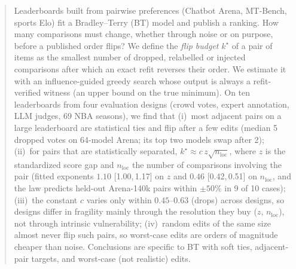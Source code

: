 \documentclass{article}
\theoremstyle{plain}
\theoremstyle{remark}
\newcommand{\nloc}{n_{\mathrm{loc}}}
\newcommand{\kstar}{k^\star}
\begin{document}
\printAffiliationsAndNotice{}

\begin{abstract}
Leaderboards built from pairwise preferences (Chatbot Arena, MT-Bench, sports Elo) fit a Bradley--Terry (BT) model and publish a ranking. How many comparisons must change, whether through noise or on purpose, before a published order flips? We define the \emph{flip budget} $\kstar$ of a pair of items as the smallest number of dropped, relabelled or injected comparisons after which an exact refit reverses their order. We estimate it with an influence-guided greedy search whose output is always a refit-verified witness (an upper bound on the true minimum). On ten leaderboards from four evaluation designs (crowd votes, expert annotation, LLM judges, 69 NBA seasons), we find that (i)~most adjacent pairs on a large leaderboard are statistical ties and flip after a few edits (median 5 dropped votes on 64-model Arena; its top two models swap after 2); (ii)~for pairs that are statistically separated, $\kstar \approx c\,z\sqrt{\nloc}$, where $z$ is the standardized score gap and $\nloc$ the number of comparisons involving the pair (fitted exponents $1.10$ [1.00,\,1.17] on $z$ and $0.46$ [0.42,\,0.51] on $\nloc$, and the law predicts held-out Arena-140k pairs within $\pm50\%$ in 9 of 10 cases); (iii)~the constant $c$ varies only within $0.45$--$0.63$ (drops) across designs, so designs differ in fragility mainly through the resolution they buy ($z$, $\nloc$), not through intrinsic vulnerability; (iv)~random edits of the same size almost never flip such pairs, so worst-case edits are orders of magnitude cheaper than noise. Conclusions are specific to BT with soft ties, adjacent-pair targets, and worst-case (not realistic) edits.
\end{abstract}
\end{document}
